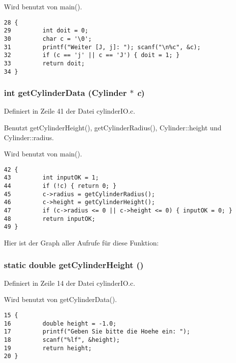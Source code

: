 Wird benutzt von main().

\footnotesize\begin{verbatim}28 {
29         int doit = 0;
30         char c = '\0'; 
31         printf("Weiter [J, j]: "); scanf("\n%c", &c);
32         if (c == 'j' || c == 'J') { doit = 1; }
33         return doit;
34 }
\end{verbatim}\normalsize 


\subsubsection{\setlength{\rightskip}{0pt plus 5cm}int get\-Cylinder\-Data ({\bf Cylinder} $\ast$ {\em c})}\label{cylinder_i_o_8c_b3241cde0b2a59c344dcec757f72a102}




Definiert in Zeile 41 der Datei cylinder\-IO.c.

Benutzt get\-Cylinder\-Height(), get\-Cylinder\-Radius(), Cylinder::height und Cylinder::radius.

Wird benutzt von main().

\footnotesize\begin{verbatim}42 {
43         int inputOK = 1;
44         if (!c) { return 0; }
45         c->radius = getCylinderRadius();
46         c->height = getCylinderHeight();
47         if (c->radius <= 0 || c->height <= 0) { inputOK = 0; }
48         return inputOK;
49 }
\end{verbatim}\normalsize 




Hier ist der Graph aller Aufrufe f\"{u}r diese Funktion:
\subsubsection{\setlength{\rightskip}{0pt plus 5cm}static double get\-Cylinder\-Height ()\hspace{0.3cm}{\tt  [static]}}\label{cylinder_i_o_8c_585a90cce19544d7b64478ba46f8ad26}




Definiert in Zeile 14 der Datei cylinder\-IO.c.

Wird benutzt von get\-Cylinder\-Data().

\footnotesize\begin{verbatim}15 {
16         double height = -1.0; 
17         printf("Geben Sie bitte die Hoehe ein: "); 
18         scanf("%lf", &height);
19         return height;
20 }
\end{verbatim}\normalsize 


